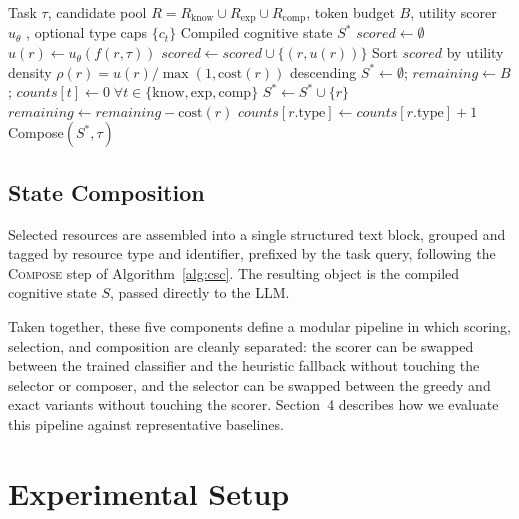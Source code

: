 \documentclass{article}
\begin{document}
\begin{algorithm}[t]
\caption{Cognitive State Compilation (CSC) \citep{martello1990knapsack}}
\label{alg:csc}
\begin{algorithmic}[1]
\Require Task $\tau$, candidate pool $R = R_{\text{know}} \cup R_{\text{exp}} \cup R_{\text{comp}}$, token budget $B$, utility scorer $u_\theta$ \citep{chen2016xgboost}, optional type caps $\{c_t\}$
\Ensure Compiled cognitive state $S^*$
\State $scored \gets \emptyset$
  \State $u(r) \gets u_\theta(f(r, \tau))$ 
  \State $scored \gets scored \cup \{(r, u(r))\}$
\EndFor
\State Sort $scored$ by utility density $\rho(r) = u(r)/\max(1, \text{cost}(r))$ descending \citep{dantzig1957discrete}
\State $S^* \gets \emptyset$; $remaining \gets B$; $counts[t] \gets 0 \; \forall t \in \{\text{know}, \text{exp}, \text{comp}\}$
    \State $S^* \gets S^* \cup \{r\}$
    \State $remaining \gets remaining - \text{cost}(r)$
    \State $counts[r.\text{type}] \gets counts[r.\text{type}] + 1$
  \EndIf
\EndFor
\State \Return Compose$(S^*, \tau)$ 
\end{algorithmic}
\end{algorithm}

\subsection{State Composition}

Selected resources are assembled into a single structured text block, grouped and tagged by resource type and identifier, prefixed by the task query, following the \textsc{Compose} step of Algorithm~\ref{alg:csc}. The resulting object is the compiled cognitive state $S$, passed directly to the LLM.

Taken together, these five components define a modular pipeline in which scoring, selection, and composition are cleanly separated: the scorer can be swapped between the trained classifier and the heuristic fallback without touching the selector or composer, and the selector can be swapped between the greedy and exact variants without touching the scorer. Section~4 describes how we evaluate this pipeline against representative baselines.

\section{Experimental Setup}
\end{document}
